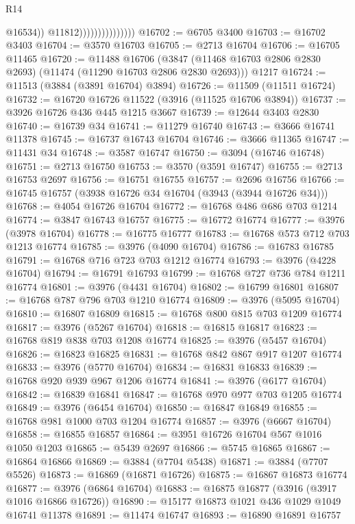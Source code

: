 \begin{lexlean}{R14}
\begin{coremodule}
                                      @16534))
                                  @11812)))))))))))))))
@16702 := @6705 @3400
@16703 := @16702 @3403
@16704 := @3570 @16703
@16705 := @2713 @16704
@16706 := @16705 @11465
@16720 := @11488
    @16706
    (@3847 (@11468 @16703 @2806 @2830 @2693) (@11474 (@11290 @16703 @2806 @2830 @2693)))
    @1217
@16724 := @11513 (@3884 (@3891 @16704) @3894)
@16726 := @11509 (@11511 @16724)
@16732 := @16720 @16726 @11522 (@3916 (@11525 @16706 @3894))
@16737 := @3926 @16726 @436 @445 @1215 @3667
@16739 := @12644 @3403 @2830
@16740 := @16739 @34
@16741 := @11279 @16740
@16743 := @3666 @16741 @11378
@16745 := @16737 @16743 @16704
@16746 := @3666 @11365
@16747 := @11431 @34
@16748 := @3587 @16747
@16750 := @3094 (@16746 @16748)
@16751 := @2713 @16750
@16753 := @3570 (@3591 @16747)
@16755 := @2713 @16753 @2697
@16756 := @16751 @16755
@16757 := @2696 @16756
@16766 := @16745 @16757 (@3938 @16726 @34 @16704 (@3943 (@3944 @16726 @34)))
@16768 := @4054 @16726 @16704
@16772 := @16768 @486 @686 @703 @1214
@16774 := @3847 @16743 @16757
@16775 := @16772 @16774
@16777 := @3976 (@3978 @16704)
@16778 := @16775 @16777
@16783 := @16768 @573 @712 @703 @1213 @16774
@16785 := @3976 (@4090 @16704)
@16786 := @16783 @16785
@16791 := @16768 @716 @723 @703 @1212 @16774
@16793 := @3976 (@4228 @16704)
@16794 := @16791 @16793
@16799 := @16768 @727 @736 @784 @1211 @16774
@16801 := @3976 (@4431 @16704)
@16802 := @16799 @16801
@16807 := @16768 @787 @796 @703 @1210 @16774
@16809 := @3976 (@5095 @16704)
@16810 := @16807 @16809
@16815 := @16768 @800 @815 @703 @1209 @16774
@16817 := @3976 (@5267 @16704)
@16818 := @16815 @16817
@16823 := @16768 @819 @838 @703 @1208 @16774
@16825 := @3976 (@5457 @16704)
@16826 := @16823 @16825
@16831 := @16768 @842 @867 @917 @1207 @16774
@16833 := @3976 (@5770 @16704)
@16834 := @16831 @16833
@16839 := @16768 @920 @939 @967 @1206 @16774
@16841 := @3976 (@6177 @16704)
@16842 := @16839 @16841
@16847 := @16768 @970 @977 @703 @1205 @16774
@16849 := @3976 (@6454 @16704)
@16850 := @16847 @16849
@16855 := @16768 @981 @1000 @703 @1204 @16774
@16857 := @3976 (@6667 @16704)
@16858 := @16855 @16857
@16864 := @3951 @16726 @16704 @567 @1016 @1050 @1203
@16865 := @5439 @2697
@16866 := @5745 @16865
@16867 := @16864 @16866
@16869 := @3884 (@7704 @5438)
@16871 := @3884 (@7707 @5526)
@16873 := @16869 (@16871 @16726)
@16875 := @16867 @16873 @16774
@16877 := @3976 (@6864 @16704)
@16883 := @16875 @16877 (@3916 (@3917 @1016 @16866 @16726))
@16890 := @15177 @16873 @1021 @436 @1029 @1049 @16741 @11378
@16891 := @11474 @16747
@16893 := @16890 @16891 @16757

\end{coremodule}
\end{lexlean}
